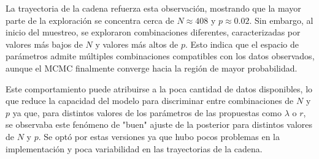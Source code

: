 La trayectoria de la cadena refuerza esta observación, mostrando que la mayor parte de la exploración se concentra cerca de $N\approx 408$ y $p \approx 0.02$. Sin embargo, al inicio del muestreo, se exploraron combinaciones diferentes, caracterizadas por valores más bajos de $N$ y valores más altos de $p$. Esto indica que el espacio de parámetros admite múltiples combinaciones compatibles con los datos observados, aunque el MCMC finalmente converge hacia la región de mayor probabilidad.

Este comportamiento puede atribuirse a la poca cantidad de datos disponibles, lo que reduce la capacidad del modelo para discriminar entre combinaciones de $N$ y $p$ ya que, para distintos valores de los parámetros de las propuestas como $\lambda$ o $r$, se observaba este fenómeno de "buen" ajuste de la posterior para distintos valores de $N$ y $p$. Se optó por estas versiones ya que hubo pocos problemas en la implementación y poca variabilidad en las trayectorias de la cadena.

